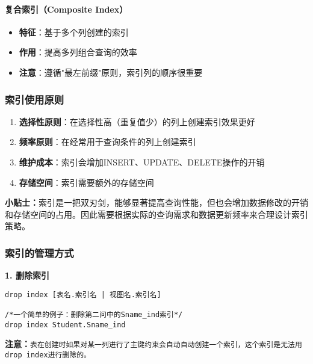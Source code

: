 \paragraph{复合索引（Composite Index）}
\begin{itemize}
  \item \textbf{特征}：基于多个列创建的索引
  \item \textbf{作用}：提高多列组合查询的效率
  \item \textbf{注意}：遵循"最左前缀"原则，索引列的顺序很重要
\end{itemize}

\subsubsection{索引使用原则}

\begin{enumerate}
  \item \textbf{选择性原则}：在选择性高（重复值少）的列上创建索引效果更好
  \item \textbf{频率原则}：在经常用于查询条件的列上创建索引
  \item \textbf{维护成本}：索引会增加INSERT、UPDATE、DELETE操作的开销
  \item \textbf{存储空间}：索引需要额外的存储空间
\end{enumerate}

\begin{mdframed}[backgroundcolor=yellow!10]
  \textbf{小贴士：}索引是一把双刃剑，能够显著提高查询性能，但也会增加数据修改的开销和存储空间的占用。因此需要根据实际的查询需求和数据更新频率来合理设计索引策略。
\end{mdframed}

\subsubsection{索引的管理方式}

\textbf{1. 删除索引}

\begin{mdframed}[backgroundcolor=gray!10]
\begin{verbatim}
drop index [表名.索引名 | 视图名.索引名]

/*一个简单的例子：删除第二问中的Sname_ind索引*/
drop index Student.Sname_ind
\end{verbatim}
\end{mdframed}

\textbf{注意：}\texttt{表在创建时如果对某一列进行了主键约束会自动自动创建一个索引，这个索引是无法用drop index进行删除的。}

